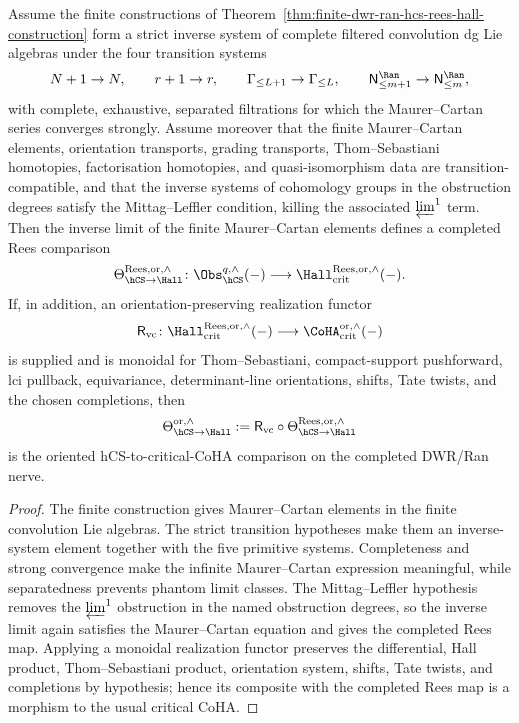 \begin{corollary}
\label{cor:completed-realised-hcs-hall-two-arrows}
Assume the finite constructions of
Theorem~\ref{thm:finite-dwr-ran-hcs-rees-hall-construction} form a
strict inverse system of complete filtered convolution dg Lie algebras
under the four transition systems
\[
 N+1\to N,\qquad r+1\to r,\qquad
 \Gamma_{\leq L+1}\to\Gamma_{\leq L},\qquad
 \mathsf N^{\Ran}_{\leq m+1}\to\mathsf N^{\Ran}_{\leq m},
\]
with complete, exhaustive, separated filtrations for which the
Maurer--Cartan series converges strongly. Assume moreover that the
finite Maurer--Cartan elements, orientation transports, grading
transports, Thom--Sebastiani homotopies, factorisation homotopies, and
quasi-isomorphism data are transition-compatible, and that the inverse
systems of cohomology groups in the obstruction degrees satisfy the
Mittag--Leffler condition, killing the associated $\varprojlim^1$ term.
Then the inverse limit of the finite Maurer--Cartan elements defines a
completed Rees comparison
\[
 \Theta_{\hCS\to\Hall}^{\mathrm{Rees},\mathrm{or},\wedge}\colon
 \Obs_{\hCS}^{q,\wedge}(-)
 \longrightarrow
 \Hall_{\mathrm{crit}}^{\mathrm{Rees},\mathrm{or},\wedge}(-).
\]
If, in addition, an orientation-preserving realization functor
\[
 \mathsf R_{\mathrm{vc}}\colon
 \Hall_{\mathrm{crit}}^{\mathrm{Rees},\mathrm{or},\wedge}(-)
 \longrightarrow
 \CoHA_{\mathrm{crit}}^{\mathrm{or},\wedge}(-)
\]
is supplied and is monoidal for Thom--Sebastiani, compact-support
pushforward, lci pullback, equivariance, determinant-line orientations,
shifts, Tate twists, and the chosen completions, then
\[
 \Theta_{\hCS\to\Hall}^{\mathrm{or},\wedge}
 :=
 \mathsf R_{\mathrm{vc}}\circ
 \Theta_{\hCS\to\Hall}^{\mathrm{Rees},\mathrm{or},\wedge}
\]
is the oriented hCS-to-critical-CoHA comparison on the completed
DWR/Ran nerve.
\end{corollary}

\begin{proof}
The finite construction gives Maurer--Cartan elements in the finite
convolution Lie algebras. The strict transition hypotheses make them an
inverse-system element together with the five primitive systems.
Completeness and strong convergence make the infinite
Maurer--Cartan expression meaningful, while separatedness prevents
phantom limit classes. The Mittag--Leffler hypothesis removes the
$\varprojlim^1$ obstruction in the named obstruction degrees, so the
inverse limit again satisfies the Maurer--Cartan equation and gives the
completed Rees map. Applying a monoidal realization
functor preserves the differential, Hall product, Thom--Sebastiani
product, orientation system, shifts, Tate twists, and completions by
hypothesis; hence its composite with the completed Rees map is a
morphism to the usual critical CoHA.
\end{proof}

